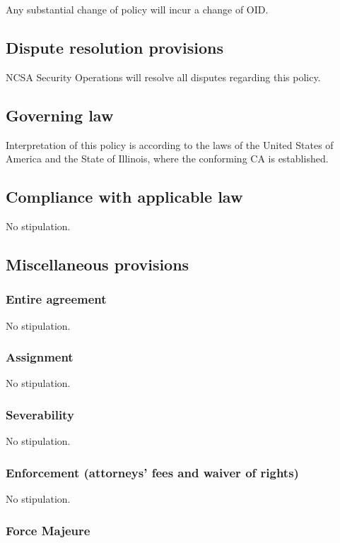 \documentclass[10pt]{article}
\begin{document}
Any substantial change of policy will incur a change of OID.

\subsection{Dispute resolution provisions}

NCSA Security Operations will resolve all disputes regarding this
policy.

\subsection{Governing law}

Interpretation of this policy is according to the laws of the United
States of America and the State of Illinois, where the conforming CA
is established.

\subsection{Compliance with applicable law}

No stipulation.

\subsection{Miscellaneous provisions}
\subsubsection{Entire agreement}

No stipulation.

\subsubsection{Assignment}

No stipulation.

\subsubsection{Severability}

No stipulation.

\subsubsection{Enforcement (attorneys' fees and waiver of rights)}

No stipulation.

\subsubsection{Force Majeure}
\end{document}
